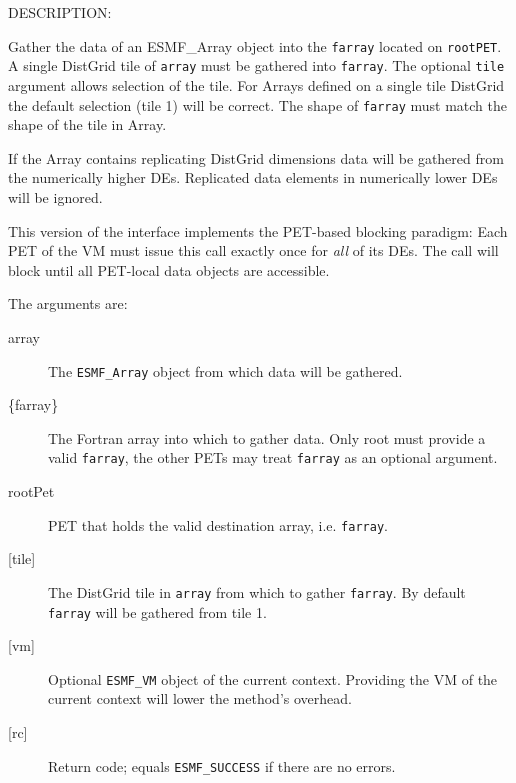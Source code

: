 {\sf DESCRIPTION:\\ }

 
   Gather the data of an {ESMF\_Array} object into the {\tt farray} located on 
   {\tt rootPET}. A single DistGrid tile of {\tt array} must be 
   gathered into {\tt farray}. The optional {\tt tile} 
   argument allows selection of the tile. For Arrays defined on a single 
   tile DistGrid the default selection (tile 1) will be correct. The 
   shape of {\tt farray} must match the shape of the tile in Array. 
   
   If the Array contains replicating DistGrid dimensions data will be 
   gathered from the numerically higher DEs. Replicated data elements in 
   numerically lower DEs will be ignored. 
   
   This version of the interface implements the PET-based blocking paradigm: 
   Each PET of the VM must issue this call exactly once for {\em all} of its 
   DEs. The call will block until all PET-local data objects are accessible. 
   
   The arguments are: 
   \begin{description} 
   \item[array] 
   The {\tt ESMF\_Array} object from which data will be gathered. 
   \item[\{farray\}] 
   The Fortran array into which to gather data. Only root 
   must provide a valid {\tt farray}, the other PETs may treat 
   {\tt farray} as an optional argument. 
   \item[rootPet] 
   PET that holds the valid destination array, i.e. {\tt farray}. 
   \item[{[tile]}] 
   The DistGrid tile in {\tt array} from which to gather {\tt farray}. 
   By default {\tt farray} will be gathered from tile 1. 
   \item[{[vm]}] 
   Optional {\tt ESMF\_VM} object of the current context. Providing the 
   VM of the current context will lower the method's overhead. 
   \item[{[rc]}] 
   Return code; equals {\tt ESMF\_SUCCESS} if there are no errors. 
   \end{description} 
   
\setlength{\parskip}{\oldparskip}
\setlength{\parindent}{\oldparindent}
\setlength{\baselineskip}{\oldbaselineskip}
